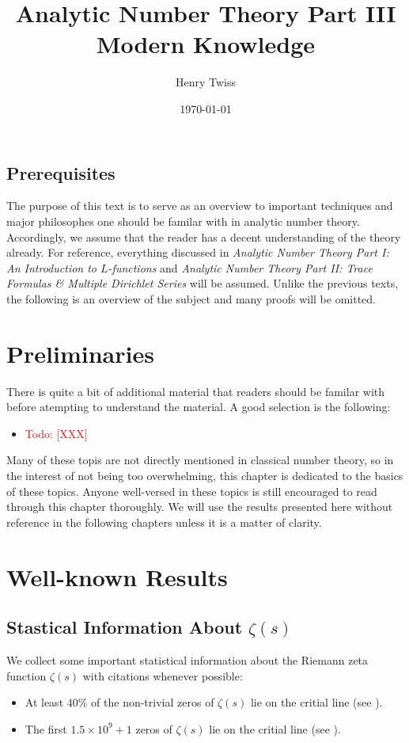 \documentclass[12pt]{book}
\title{Analytic Number Theory Part III \\ \large{Modern Knowledge}}
\author{Henry Twiss}
\date{\today}
\theoremstyle{definition}\newframedtheorem{method}{Method}
\newcommand{\z}{\zeta}
\newcommand{\x}{\times}
\newcommand{\<}{\langle}
\renewcommand{\>}{\rangle}
\newcommand{\todo}[1]{\textcolor{red}{\sf Todo: [#1]}}
\begin{document}
\maketitle
\thispagestyle{fancy}

\newpage

\section*{Prerequisites}
  The purpose of this text is to serve as an overview to important techniques and major philosophes one should be familar with in analytic number theory. Accordingly, we assume that the reader has a decent understanding of the theory already. For reference, everything discussed in \textit{Analytic Number Theory Part I: An Introduction to $L$-functions} and \textit{Analytic Number Theory Part II: Trace Formulas \& Multiple Dirichlet Series} will be assumed. Unlike the previous texts, the following is an overview of the subject and many proofs will be omitted.

\newpage

\tableofcontents

\newpage

\chapter{Preliminaries}
  There is quite a bit of additional material that readers should be familar with before atempting to understand the material. A good selection is the following:
  \begin{itemize}
    \item \todo{XXX}
  \end{itemize}
  Many of these topis are not directly mentioned in classical number theory, so in the interest of not being too overwhelming, this chapter is dedicated to the basics of these topics. Anyone well-versed in these topics is still encouraged to read through this chapter thoroughly. We will use the results presented here without reference in the following chapters unless it is a matter of clarity.
\chapter{Well-known Results}
  \section{Stastical Information About \texorpdfstring{$\z(s)$}{z(s)}}
    We collect some important statistical information about the Riemann zeta function $\z(s)$ with citations whenever possible:
    \begin{itemize}
      \item At least $40\%$ of the non-trivial zeros of $\z(s)$ lie on the critial line (see \cite{conrey1989more}).
      \item The first $1.5 \x 10^{9}+1$ zeros of $\z(s)$ lie on the critial line (see \cite{van1986zeros}).
    \end{itemize}
\end{document}

